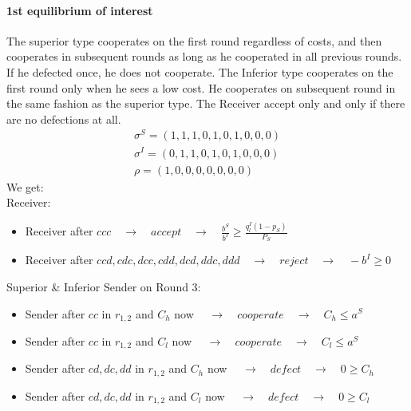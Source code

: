 \documentclass[11pt]{article}
\theoremstyle{plainCl1}
\begin{document}
\paragraph{1st equilibrium of interest}
The superior type cooperates on the first round regardless of costs, and then cooperates in subsequent rounds as long as he cooperated in all previous rounds. If he defected once, he does not cooperate. The Inferior type cooperates on the first round only when he sees a low cost. He cooperates on subsequent round in the same fashion as the superior type. The Receiver accept only and only if there are no defections at all.\\
	\begin{equation}\label{strategies}
	\begin{array}{l}	
	\sigma^S = (1, 1, 1, 0, 1, 0, 1, 0, 0, 0)\\
	\sigma^I = (0, 1, 1, 0, 1, 0, 1, 0, 0, 0)\\
	\rho = (1, 0, 0, 0, 0, 0, 0, 0)
	\end{array}
	\end{equation}
We get:\\	
Receiver:
\begin{itemize} [noitemsep]
	\item Receiver after $ccc \quad \rightarrow \quad accept \quad \rightarrow \quad \frac{b^S}{b^I}\geq \frac{q^I_l (1-p_S)}{P_S}$\\
	\item Receiver after $ccd, cdc, dcc, cdd, dcd, ddc, ddd \quad \rightarrow \quad reject \quad \rightarrow \quad -b^I \geq 0$\\
\end{itemize}
Superior \& Inferior Sender on Round 3:
\begin{itemize} [noitemsep]
	\item Sender after $cc$ in $r_{1,2}$ and $C_h$ now $\quad \rightarrow \quad cooperate \quad \rightarrow \quad C_h \leq a^S$\\
	\item Sender after $cc$ in $r_{1,2}$ and $C_l$ now $\quad \rightarrow \quad cooperate \quad \rightarrow \quad C_l \leq a^S$\\
	\item Sender after $cd, dc, dd$ in $r_{1,2}$ and $C_h$ now $\quad \rightarrow \quad defect \quad \rightarrow \quad 0 \geq C_h$\\
	\item Sender after $cd, dc, dd$ in $r_{1,2}$ and $C_l$ now $\quad \rightarrow \quad defect \quad \rightarrow \quad 0 \geq C_l$\\
\end{itemize}
\end{document}
